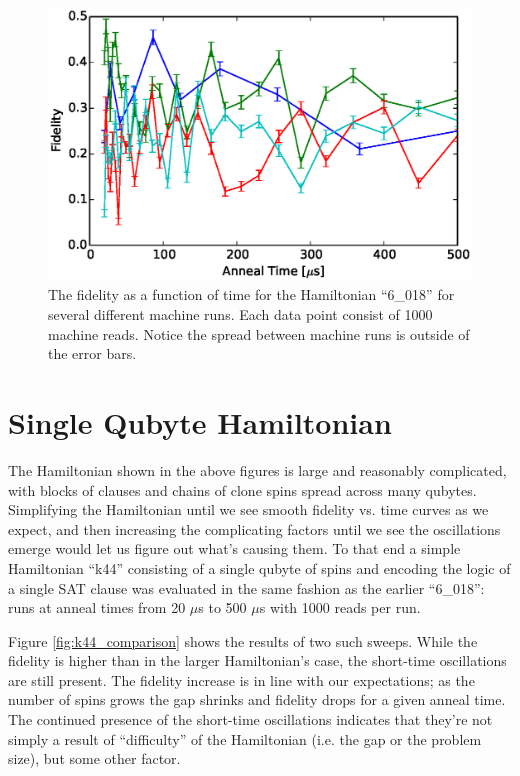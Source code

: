 \begin{figure}
	\includegraphics{img/6_018_comparison.eps}
	\caption[Short Time Fidelities]{The fidelity as a function of time for the Hamiltonian ``6\_018'' for several different machine runs.  Each data point consist of 1000 machine reads.  Notice the spread between machine runs is outside of the error bars.}
	\label{fig:short_fidelity}
\end{figure}

\section{Single Qubyte Hamiltonian}
The Hamiltonian shown in the above figures is large and reasonably complicated, with blocks of clauses and chains of clone spins spread across many qubytes.  Simplifying the Hamiltonian until we see smooth fidelity vs. time curves as we expect, and then increasing the complicating factors until we see the oscillations emerge would let us figure out what's causing them.  To that end a simple Hamiltonian ``k44'' consisting of a single qubyte of spins and encoding the logic of a single SAT clause was evaluated in the same fashion as the earlier ``6\_018'': runs at anneal times from 20 $\mu$s to 500 $\mu$s with 1000 reads per run.  

Figure \ref{fig:k44_comparison} shows the results of two such sweeps.  While the fidelity is higher than in the larger Hamiltonian's case, the short-time oscillations are still present.  The fidelity increase is in line with our expectations; as the number of spins grows the gap shrinks and fidelity drops for a given anneal time.  The continued presence of the short-time oscillations indicates that they're not simply a result of ``difficulty'' of the Hamiltonian (i.e. the gap or the problem size), but some other factor.

